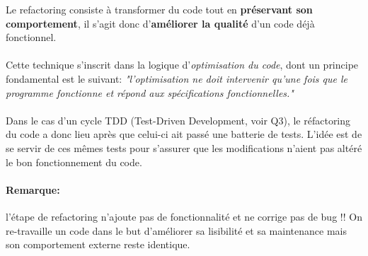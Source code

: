 \item{}
{Le refactoring consiste à transformer du code tout en \textbf{préservant son comportement}, il s'agit donc d'\textbf{améliorer la qualité} d'un code déjà fonctionnel.
\paragraph{}
Cette technique s'inscrit dans la logique d'\textit{optimisation du code}, dont un principe fondamental est le suivant: \textit{"l'optimisation ne doit intervenir qu'une fois que le programme fonctionne et répond aux spécifications fonctionnelles."}
\paragraph{}
Dans le cas d'un cycle TDD (Test-Driven Development, voir Q3), le réfactoring du code a donc lieu après que celui-ci ait passé une batterie de tests. L'idée est de se servir de ces mêmes tests pour s'assurer que les modifications n'aient pas altéré le bon fonctionnement du code.
\paragraph{Remarque: }
l'étape de refactoring n'ajoute pas de fonctionnalité et ne corrige pas de bug !! On re-travaille un code dans le but d'améliorer sa lisibilité et sa maintenance mais son comportement externe reste identique.

}

\item{}
{}

\item{}
{}

\item{}
{}

\item{}
{}

\item{}
{}